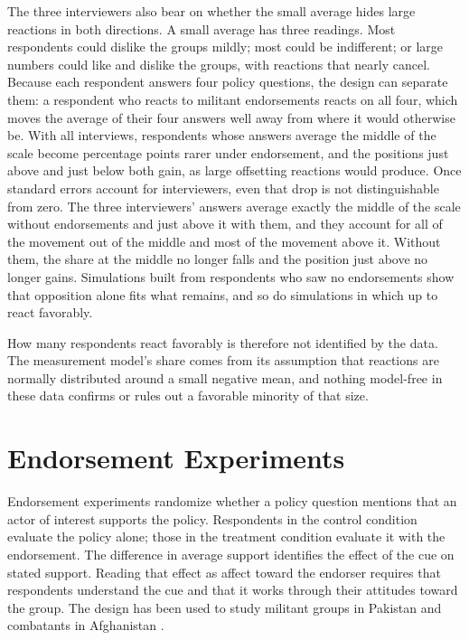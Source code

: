 \documentclass[11pt,letterpaper]{article}
\begin{document}
The three interviewers also bear on whether the small average hides large reactions in both directions. A small average has three readings. Most respondents could dislike the groups mildly; most could be indifferent; or large numbers could like and dislike the groups, with reactions that nearly cancel. Because each respondent answers four policy questions, the design can separate them: a respondent who reacts to militant endorsements reacts on all four, which moves the average of their four answers well away from where it would otherwise be. With all interviews, respondents whose answers average the middle of the scale become \FullMidpointDrop{} percentage points rarer under endorsement, and the positions just above and just below both gain, as large offsetting reactions would produce. Once standard errors account for interviewers, even that drop is not distinguishable from zero. The three interviewers' answers average exactly the middle of the scale without endorsements and just above it with them, and they account for all of the movement out of the middle and most of the movement above it. Without them, the share at the middle no longer falls and the position just above no longer gains. Simulations built from respondents who saw no endorsements show that opposition alone fits what remains, and so do simulations in which up to \TwoSidedTopFavour{} react favorably.

How many respondents react favorably is therefore not identified by the data. The measurement model's share comes from its assumption that reactions are normally distributed around a small negative mean, and nothing model-free in these data confirms or rules out a favorable minority of that size.

\section{Endorsement Experiments}
\label{sec:background}

Endorsement experiments randomize whether a policy question mentions that an actor of interest supports the policy. Respondents in the control condition evaluate the policy alone; those in the treatment condition evaluate it with the endorsement. The difference in average support identifies the effect of the cue on stated support. Reading that effect as affect toward the endorser requires that respondents understand the cue and that it works through their attitudes toward the group. The design has been used to study militant groups in Pakistan and combatants in Afghanistan \citep{bullock2011statistical, blair2013poverty, lyall2013explaining, blair2014comparing}.
\end{document}
